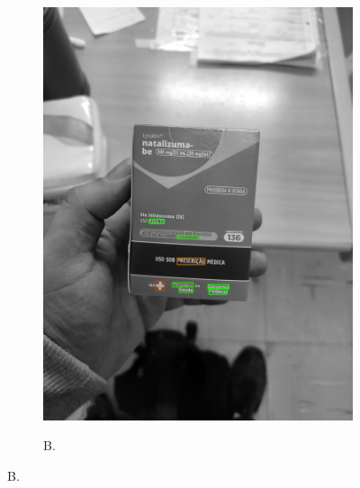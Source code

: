 \begin{figure}[htb]
\begin{subfigure}[t]{0.21\textwidth}
        \includegraphics[width=\linewidth]{../pictures/tysabri_rgb_g_only_boxes.jpg}
    \end{subfigure}
    \hfill
    \begin{subfigure}[t]{0.21\textwidth}
        \centering
        \caption{B.}
        \label{fig:foto:versoes:1:B:boxes}

\end{subfigure}
\end{figure}
